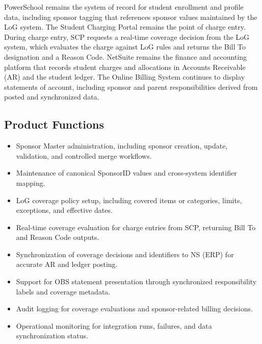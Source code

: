 \documentclass[12pt,a4paper]{article}
\begin{document}
PowerSchool remains the system of record for student enrollment and profile data, including sponsor tagging that references sponsor values maintained by the LoG system. The Student Charging Portal remains the point of charge entry. During charge entry, SCP requests a real-time coverage decision from the LoG system, which evaluates the charge against LoG rules and returns the Bill To designation and a Reason Code. NetSuite remains the finance and accounting platform that records student charges and allocations in Accounts Receivable (AR) and the student ledger. The Online Billing System continues to display statements of account, including sponsor and parent responsibilities derived from posted and synchronized data.

\subsection{Product Functions}
\begin{itemize}
  \item Sponsor Master administration, including sponsor creation, update, validation, and controlled merge workflows.
  \item Maintenance of canonical SponsorID values and cross-system identifier mapping.
  \item LoG coverage policy setup, including covered items or categories, limits, exceptions, and effective dates.
  \item Real-time coverage evaluation for charge entries from SCP, returning Bill To and Reason Code outputs.
  \item Synchronization of coverage decisions and identifiers to NS (ERP) for accurate AR and ledger posting.
  \item Support for OBS statement presentation through synchronized responsibility labels and coverage metadata.
  \item Audit logging for coverage evaluations and sponsor-related billing decisions.
  \item Operational monitoring for integration runs, failures, and data synchronization status.
\end{itemize}
\end{document}
